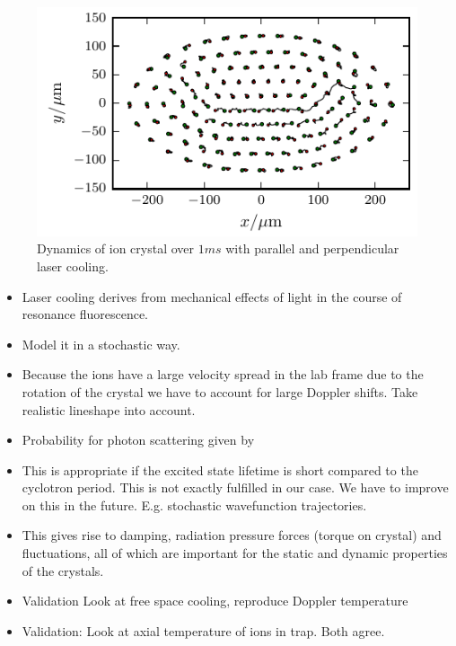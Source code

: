 \documentclass[
  aps,
  reprint,
  twoside,
  showpacs,
  amsmath,
  amssymb,
  floatfix
]{revtex4-1}
\begin{document}
\begin{figure}
\center\includegraphics[width=0.95\columnwidth]{figures/rearrangement}
\caption{Dynamics of ion crystal over $1ms$ with parallel and
  perpendicular laser cooling.}
\label{fig:ionDynamicsAxialPerp}
\end{figure}
\begin{itemize}

\item Laser cooling derives from mechanical effects of light in the
course of resonance fluorescence.

\item Model it in a stochastic way.

\item Because the ions have a large velocity spread in the lab frame due
to the rotation of the crystal we have to account for large Doppler
shifts.  Take realistic lineshape into account.

\item Probability for photon scattering given by

\item This is appropriate if the excited state lifetime is short
compared to the cyclotron period.  This is not exactly fulfilled in our
case.  We have to improve on this in the future.  E.g. stochastic
wavefunction trajectories.

\item This gives rise to damping, radiation pressure forces (torque on
    crystal) and fluctuations, all of which are important for the
static and dynamic properties of the crystals.

\item Validation Look at free space cooling, reproduce Doppler
temperature

\item Validation: Look at axial temperature of ions in trap.  Both
agree.

\end{itemize}
\end{document}
